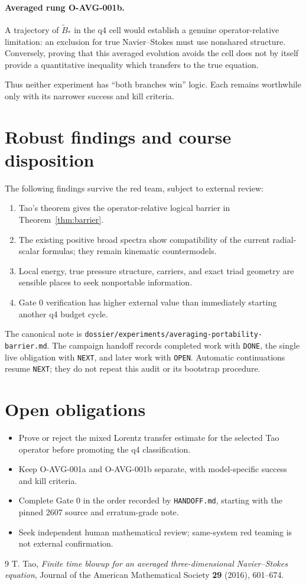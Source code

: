 \documentclass[11pt]{article}
\theoremstyle{remark}
\begin{document}
\paragraph{Averaged rung O-AVG-001b.}
A trajectory of \(\widetilde B_*\) in the q4 cell would establish a
genuine operator-relative limitation: an exclusion for true
Navier--Stokes must use nonshared structure.  Conversely, proving that
this averaged evolution avoids the cell does not by itself provide a
quantitative inequality which transfers to the true equation.

Thus neither experiment has ``both branches win'' logic.  Each remains
worthwhile only with its narrower success and kill criteria.

\section{Robust findings and course disposition}

The following findings survive the red team, subject to external
review:
\begin{enumerate}
\item Tao's theorem gives the operator-relative logical barrier in
Theorem~\ref{thm:barrier}.
\item The existing positive broad spectra show compatibility of the
current radial-scalar formulas; they remain kinematic countermodels.
\item Local energy, true pressure structure, carriers, and exact triad
geometry are sensible places to seek nonportable information.
\item Gate 0 verification has higher external value than immediately
starting another q4 budget cycle.
\end{enumerate}

The canonical note is
\texttt{dossier/experiments/averaging-portability-barrier.md}.
The campaign handoff records completed work with \texttt{DONE}, the
single live obligation with \texttt{NEXT}, and later work with
\texttt{OPEN}.  Automatic continuations resume \texttt{NEXT}; they do
not repeat this audit or its bootstrap procedure.

\section{Open obligations}

\begin{itemize}
\item Prove or reject the mixed Lorentz transfer estimate for the
selected Tao operator before promoting the q4 classification.
\item Keep O-AVG-001a and O-AVG-001b separate, with model-specific
success and kill criteria.
\item Complete Gate 0 in the order recorded by \texttt{HANDOFF.md},
starting with the pinned 2607 source and erratum-grade note.
\item Seek independent human mathematical review; same-system red
teaming is not external confirmation.
\end{itemize}

\begin{thebibliography}{9}
T. Tao,
\emph{Finite time blowup for an averaged three-dimensional
Navier--Stokes equation},
Journal of the American Mathematical Society \textbf{29} (2016),
601--674.
\end{thebibliography}
\end{document}
